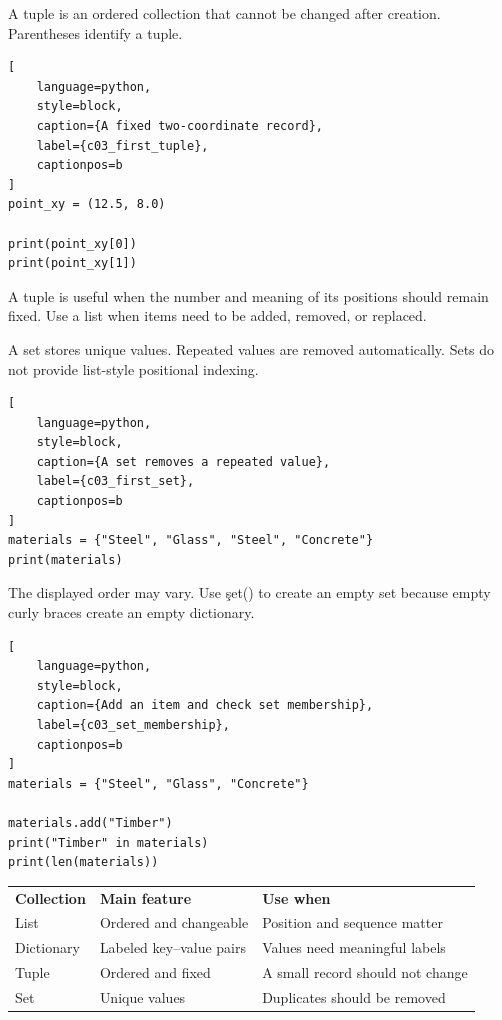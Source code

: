 
A tuple is an ordered collection that cannot be changed after creation.
Parentheses identify a tuple.

\begin{lstlisting}[
    language=python,
    style=block,
    caption={A fixed two-coordinate record},
    label={c03_first_tuple},
    captionpos=b
]
point_xy = (12.5, 8.0)

print(point_xy[0])
print(point_xy[1])
\end{lstlisting}

A tuple is useful when the number and meaning of its positions should remain
fixed. Use a list when items need to be added, removed, or replaced.


A set stores unique values. Repeated values are removed automatically. Sets do
not provide list-style positional indexing.

\begin{lstlisting}[
    language=python,
    style=block,
    caption={A set removes a repeated value},
    label={c03_first_set},
    captionpos=b
]
materials = {"Steel", "Glass", "Steel", "Concrete"}
print(materials)
\end{lstlisting}

The displayed order may vary. Use \c{set()} to create an empty set because
empty curly braces create an empty dictionary.

\begin{lstlisting}[
    language=python,
    style=block,
    caption={Add an item and check set membership},
    label={c03_set_membership},
    captionpos=b
]
materials = {"Steel", "Glass", "Concrete"}

materials.add("Timber")
print("Timber" in materials)
print(len(materials))
\end{lstlisting}


\begin{center}
\begin{tabular}{lll}
\textbf{Collection} & \textbf{Main feature} & \textbf{Use when} \\
List & Ordered and changeable & Position and sequence matter \\
Dictionary & Labeled key--value pairs & Values need meaningful labels \\
Tuple & Ordered and fixed & A small record should not change \\
Set & Unique values & Duplicates should be removed \\
\end{tabular}
\end{center}


